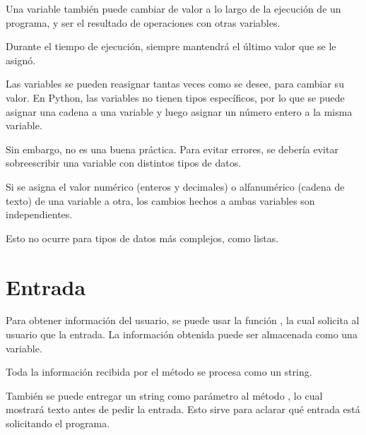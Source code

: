 Una variable también puede cambiar de valor a lo largo de la ejecución de un programa, y ser el resultado de operaciones con otras variables.


Durante el tiempo de ejecución, siempre mantendrá el último valor que se le asignó.


Las variables se pueden reasignar tantas veces como se desee, para cambiar su valor. En Python, las variables no tienen tipos específicos, por lo que se puede asignar una cadena a una variable y luego asignar un número entero a la misma variable.


Sin embargo, no es una buena práctica. Para evitar errores, se debería evitar sobreescribir una variable con distintos tipos de datos.\smallskip

Si se asigna el valor numérico (enteros y decimales) o alfanumérico (cadena de texto) de una variable a otra, los cambios hechos a ambas variables son independientes.


Esto no ocurre para tipos de datos más complejos, como listas.

\section{Entrada}

Para obtener información del usuario, se puede usar la función , la cual solicita al usuario que la entrada. La información obtenida puede ser almacenada como una variable.


Toda la información recibida por el método  se procesa como un string.\smallskip

También se puede entregar un string como parámetro al método , lo cual mostrará texto antes de pedir la entrada. Esto sirve para aclarar qué entrada está solicitando el programa.


